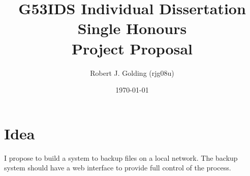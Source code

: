 \documentclass[9pt]{article}
\title{
	\vspace{5cm}
	\huge{\textbf{G53IDS Individual Dissertation}} \\[0.2cm]
	\LARGE{\textbf{Single Honours}} \\[0.5cm]
    \LARGE{Project Proposal} \\[0.2cm]
}
\author{Robert J. Golding (rjg08u)} \date{\today}
\begin{document}
	\maketitle
	\newpage
	\section{Idea}
        I propose to build a system to backup files on a local network. The backup system should have a web interface to provide full control of the process.
\end{document}
